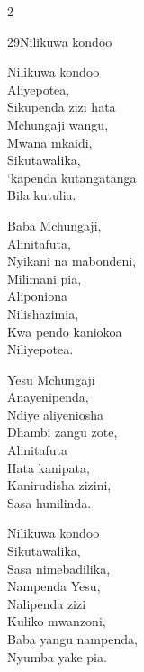 \documentclass{article}
\begin{document}
\begin{multicols}{2}
\begin{hymn}{29}{Nilikuwa kondoo}{}
\begin{stanza}
Nilikuwa kondoo\\
Aliyepotea,\\
Sikupenda zizi hata\\
Mchungaji wangu,\\
Mwana mkaidi,\\
Sikutawalika,\\
`kapenda kutangatanga\\
Bila kutulia.
\end{stanza}
\begin{stanza}
Baba Mchungaji,\\
Alinitafuta,\\
Nyikani na mabondeni,\\
Milimani pia,\\
Aliponiona\\
Nilishazimia,\\
Kwa pendo kaniokoa\\
Niliyepotea.
\end{stanza}
\begin{stanza}
Yesu Mchungaji\\
Anayenipenda,\\
Ndiye aliyeniosha\\
Dhambi zangu zote,\\
Alinitafuta\\
Hata kanipata,\\
Kanirudisha zizini,\\
Sasa hunilinda.
\end{stanza}
\begin{stanza}
Nilikuwa kondoo\\
Sikutawalika,\\
Sasa nimebadilika,\\
Nampenda Yesu,\\
Nalipenda zizi\\
Kuliko mwanzoni,\\
Baba yangu nampenda,\\
Nyumba yake pia.
\end{stanza}
\end{hymn}


\end{multicols}
\end{document}
